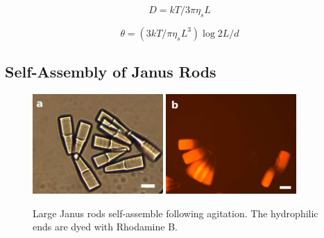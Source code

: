 \begin{center}
\begin{equation}
D = kT/3\pi\eta_s L
\label{eq:trans-th}
\end{equation}
\end{center}

\begin{center}
\begin{equation}
\theta = (3kT/\pi \eta_s L^3) \log{2L/d}
\label{eq:rot-th}
\end{equation}
\end{center}


\subsection{Self-Assembly of Janus Rods}
\label{sec:assembly-janus-rods}


\begin{figure}
\begin{center}
\includegraphics[height=1.5in]{figures/rods/large-janus-rods-45x11x11um.jpg}
\includegraphics[height=1.5in]{figures/rods/large-janus-self-assembly.jpg}
\end{center}
\caption{Large Janus rods self-assemble following agitation. The hydrophilic 
ends are dyed with Rhodamine B.}
\label{fig:big-janus-assembly}
\end{figure}

